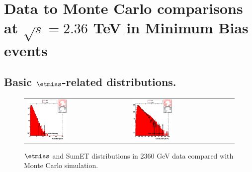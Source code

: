 \section{Data to Monte Carlo comparisons at $\sqrt{s}=2.36$ TeV in
  Minimum Bias events}
\label{sc:DataVsMCMB2360}

\subsection{Basic $\etmiss$-related distributions.}
\begin{figure}[h!]
 \centering
 \begin{tabular}{ll}
  \includegraphics[width=0.40\textwidth]{plots_DataVsMC_MB_2360GeV/h_calometPt.eps} &
  \includegraphics[width=0.40\textwidth]{plots_DataVsMC_MB_2360GeV/h_caloSumet.eps} \\
 \end{tabular}
 \caption{$\etmiss$ and SumET distributions in 2360 GeV data compared
   with Monte Carlo simulation.
          \label{fig:DataVsMC_MB_2360_1}}
\end{figure}

